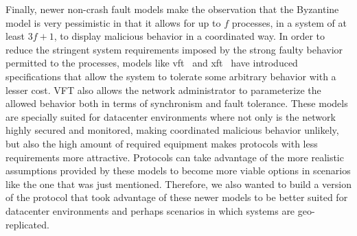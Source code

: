 Finally, newer non-crash fault models make the observation that the Byzantine model is very pessimistic in that it allows for up to $f$ processes, in a system of at least $3f+1$, to display malicious behavior in a coordinated way. In order to reduce the stringent system requirements imposed by the strong faulty behavior permitted to the processes, models like \acrshort{vft}~\cite{Porto2015} and \acrshort{xft}~\cite{Liu2015} have introduced specifications that allow the system to tolerate some arbitrary behavior with a lesser cost. VFT also allows the network administrator to parameterize the allowed behavior both in terms of synchronism and fault tolerance. These models are specially suited for datacenter environments where not only is the network highly secured and monitored, making coordinated malicious behavior unlikely, but also the high amount of required equipment makes protocols with less requirements more attractive. Protocols can take advantage of the more realistic assumptions provided by these models to become more viable options in scenarios like the one that was just mentioned. Therefore, we also wanted to build a version of the protocol that took advantage of these newer models to be better suited for datacenter environments and perhaps scenarios in which systems are geo-replicated. \par

